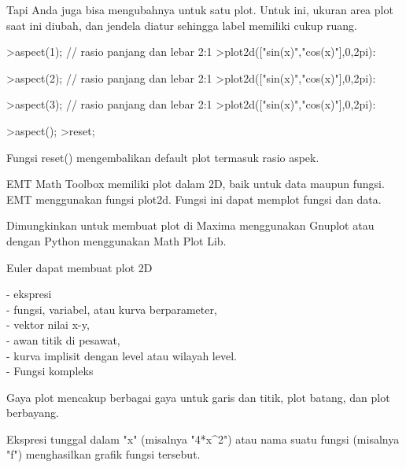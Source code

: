 \documentclass[a4paper,10pt]{article}
\begin{document}
\begin{eulernotebook}
\begin{eulercomment}
\begin{eulercomment}
\begin{eulercomment}
Tapi Anda juga bisa mengubahnya untuk satu plot. Untuk ini, ukuran
area plot saat ini diubah, dan jendela diatur sehingga label memiliki
cukup ruang.
\end{eulercomment}
\begin{eulerprompt}
>aspect(1); // rasio panjang dan lebar 2:1
>plot2d(["sin(x)","cos(x)"],0,2pi):
\end{eulerprompt}
\begin{eulerprompt}
>aspect(2); // rasio panjang dan lebar 2:1
>plot2d(["sin(x)","cos(x)"],0,2pi):
\end{eulerprompt}
\begin{eulerprompt}
>aspect(3); // rasio panjang dan lebar 2:1
>plot2d(["sin(x)","cos(x)"],0,2pi):
\end{eulerprompt}
\begin{eulerprompt}
>aspect();
>reset;
\end{eulerprompt}
\begin{eulercomment}
Fungsi reset() mengembalikan default plot termasuk rasio aspek.\\
\begin{eulercomment}
\begin{eulercomment}
EMT Math Toolbox memiliki plot dalam 2D, baik untuk data maupun
fungsi. EMT menggunakan fungsi plot2d. Fungsi ini dapat memplot fungsi
dan data.

Dimungkinkan untuk membuat plot di Maxima menggunakan Gnuplot atau
dengan Python menggunakan Math Plot Lib.

Euler dapat membuat plot 2D

- ekspresi\\
- fungsi, variabel, atau kurva berparameter,\\
- vektor nilai x-y,\\
- awan titik di pesawat,\\
- kurva implisit dengan level atau wilayah level.\\
- Fungsi kompleks

Gaya plot mencakup berbagai gaya untuk garis dan titik, plot batang,
dan plot berbayang.\\
\begin{eulercomment}
\begin{eulercomment}
Ekspresi tunggal dalam "x" (misalnya "4*x\textasciicircum{}2") atau nama suatu fungsi
(misalnya "f") menghasilkan grafik fungsi tersebut.


\end{eulercomment}
\end{eulercomment}
\end{eulercomment}
\end{eulercomment}
\end{eulercomment}
\end{eulercomment}
\end{eulercomment}
\end{eulernotebook}
\end{document}
